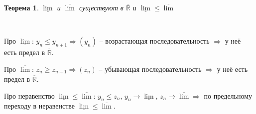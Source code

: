 \documentclass[12pt,letterpaper]{report}
\makeatletter
\newtheorem*{theorem-non}{Теорема}
\theoremstyle{definition}
\renewenvironment{proof}[1][\proofname]{%
   \par\pushQED{\qed}\normalfont%
   \topsep6\p@\@plus6\p@\relax
   \trivlist\item[\hskip\labelsep\bfseries#1\@addpunct{.}]%
   \ignorespaces
}{%
   \popQED\endtrivlist\@endpefalse
}
\makeatother
\begin{document}
    \begin{theorem-non}
        $\underline{\lim}$ и $\overline{\lim}$ существуют в 
        $\overline{\mathbb{R}}$ и $\underline{\lim} \leq \overline{\lim}$
    \end{theorem-non}
    \begin{proof} $ $
    
    Про $\underline{\lim}$: $y_n \leq y_{n+1} \Rightarrow (y_n)$ --
    возрастающая последовательность $\Rightarrow$ у неё есть предел в
    $\overline{\mathbb{R}}$.
    
    Про $\overline{\lim}$: $z_n \geq z_{n+1} \Rightarrow (z_n)$ --
    убывающая последовательность $\Rightarrow$ у неё есть предел в
    $\overline{\mathbb{R}}$.
    
    Про неравенство $\underline{\lim} \leq \overline{\lim}$:
    $y_n \leq z_n$, $y_n \rightarrow \underline{\lim}$,
    $z_n \rightarrow \overline{\lim} \Rightarrow$ по предельному
    переходу в неравенстве $\underline{\lim} \leq \overline{\lim}$.
    \end{proof}
    
\end{document}

